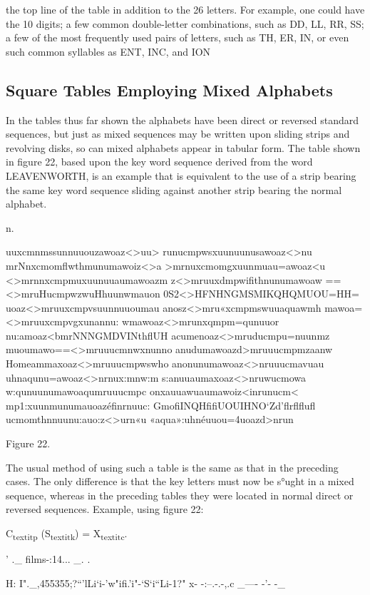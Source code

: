 the top line of the table in addition to the 26 letters. For example, one
could have the 10 digits; a few common double-letter combinations, such
as DD, LL, RR, SS; a few of the most frequently used pairs of letters,
such as TH, ER, IN, or even such common syllables as ENT, INC, and
ION

\subsection{Square Tables Employing Mixed Alphabets}

\mypara In the tables thus far shown the alphabets have been direct or
reversed standard sequences, but just as mixed sequences may be written
upon sliding strips and revolving disks, so can mixed alphabets appear in
tabular form. The table shown in ﬁgure 22, based upon the key word
sequence derived from the word LEAVENWORTH, is an example that
is equivalent to the use of a strip bearing the same key word sequence
sliding against another strip bearing the normal alphabet.

n.

uuxcmnmssunnuuouzawoaz<>uu>
runucmpwsxuunuunusawoaz<>nu
mrNnxcmomﬂwthmunumawoiz<>a
>mrnuxcmomgxuunmuau=awoaz<u
<>mrnnxcmpmuxuunuuaumawoazm
z<>mruuxdmpwiﬁthnunumawoaw
==<>mruHucmpwzwuHhuunwmauon
0S2<>HFNHNGMSMIKQHQMUOU=HH=
uoaz<>mruuxcmpvsuunnuuoumau
anosz<>mru«xcmpmswuuaquawmh
mawoa=<>mruuxcmpvgxunannu:
wmawoaz<>mrunxqmpm=qunuuor
nu:amoaz<bmrNNNGMDVINthﬂUH
acumenoaz<>mruducmpu=nuunmz
muoumawo==<>mruuucmnwxnunno
anudumawoazd>mruuucmpmzaanw
Homeammaxoaz<>mruuucmpwswho
anonunumawoaz<>nruuucmavuau
uhnaqunu=awoaz<>nrnux:mnw:m
s:anuuaumaxoaz<>nruwucmowa
w:qunuunumawoaqumruuucmpc
onxauuawuaumawoiz<inrunucm<
mp1:xuunmunumauoazéﬁnrnuuc:
GmoﬁINQHﬁﬁUOUIHNO‘Zd’ﬂrﬂﬂuﬂ
ucmomthnnuunu:auo:z<>urn«u
«aqua»:uhnéuuou=4uoazd>nrun

Figure 22.

The usual method of using such a table is the same as that in the preceding cases. The only difference is that the key letters must now be
s°ught in a mixed sequence, whereas in the preceding tables they were
located in normal direct or reversed sequences. Example, using ﬁgure 22:

C\textsubscript{textit{p}} (S\textsubscript{textit{k}}) = X\textsubscript{textit{c}}.


 

' ._ ﬁlms-:14... _. .

H: I"._,455355;?“'lLi‘i-'w"ifi.'i"-‘S‘i“Li-1?" x- -:--.-.-,.c _---- -'- -_

